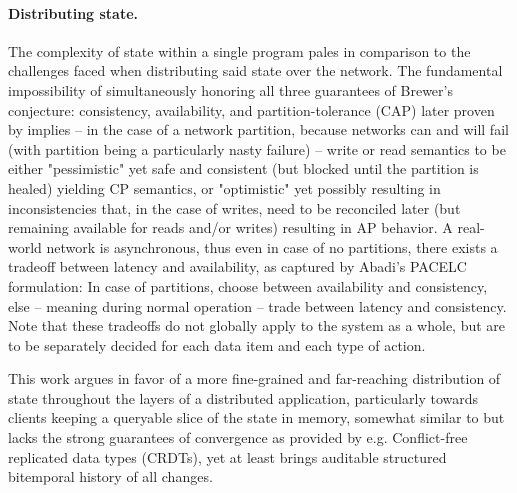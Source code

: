 \paragraph{Distributing state.} The complexity of state within a single program pales in comparison to the challenges faced when distributing said state over the network. The fundamental impossibility of simultaneously honoring all three guarantees of Brewer's conjecture: consistency, availability, and partition-tolerance (CAP) \cite{brewer2000towards} later proven by \cite{gilbert2002brewer} implies -- in the case of a network partition, because networks can and will fail (with partition being a particularly nasty failure) -- write or read semantics to be either "pessimistic" yet safe and consistent (but blocked until the partition is healed) yielding CP semantics, or "optimistic" yet possibly resulting in inconsistencies that, in the case of writes, need to be reconciled later (but remaining available for reads and/or writes) resulting in AP behavior. A real-world network is asynchronous, thus even in case of no partitions, there exists a tradeoff between latency and availability, as captured by Abadi's \gls{PACELC} \cite{abadi2012consistency} formulation: In case of partitions, choose between availability and consistency, else -- meaning during normal operation -- trade between latency and consistency. Note that these tradeoffs do not globally apply to the system as a whole, but are to be separately decided for each data item and each type of action.

This work argues in favor of a more fine-grained and far-reaching distribution of state throughout the layers of a distributed application, particularly towards clients keeping a queryable slice of the state in memory, somewhat similar to \cite{jungnickel2018feasibility} but lacks the strong guarantees of convergence as provided by e.g. Conflict-free replicated data types (CRDTs), yet at least brings auditable structured bitemporal history of all changes.
